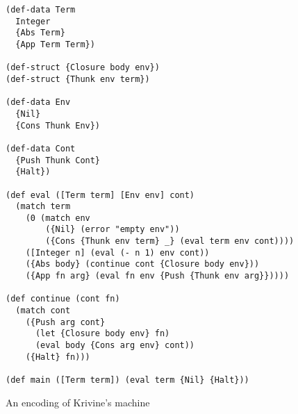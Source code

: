 \begin{figure}[ht]
\begin{lstlisting}
(def-data Term
  Integer
  {Abs Term}
  {App Term Term})

(def-struct {Closure body env})
(def-struct {Thunk env term})

(def-data Env
  {Nil}
  {Cons Thunk Env})

(def-data Cont
  {Push Thunk Cont}
  {Halt})

(def eval ([Term term] [Env env] cont)
  (match term
    (0 (match env
        ({Nil} (error "empty env"))
        ({Cons {Thunk env term} _} (eval term env cont))))
    ([Integer n] (eval (- n 1) env cont))
    ({Abs body} (continue cont {Closure body env}))
    ({App fn arg} (eval fn env {Push {Thunk env arg}}))))

(def continue (cont fn)
  (match cont
    ({Push arg cont}
      (let {Closure body env} fn)
      (eval body {Cons arg env} cont))
    ({Halt} fn)))

(def main ([Term term]) (eval term {Nil} {Halt}))
\end{lstlisting}
\caption{An encoding of Krivine's machine}
\label{fig:krivines-machine}
\end{figure}